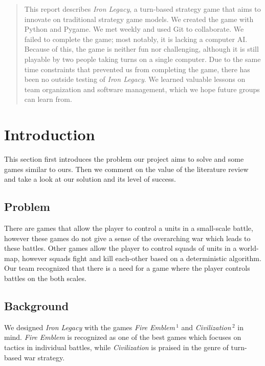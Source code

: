 \documentclass{article}
\begin{document}
\vfill

\begin{abstract}
This report describes \emph{Iron Legacy}, a turn-based strategy game that aims 
to innovate on traditional strategy game models. We created the game with 
Python and Pygame. We met weekly and used Git to collaborate. We failed to 
complete the game; most notably, it is lacking a computer AI. Because of this, 
the game is neither fun nor challenging, although it is still playable by two
people taking turns on a single computer. Due to the same time constraints that 
prevented us from completing the game, there has been no outside testing of 
\emph{Iron Legacy}. We learned valuable lessons on team organization and 
software management, which we hope future groups can learn from.
\end{abstract}

\clearpage

\tableofcontents

\clearpage

\section*{Introduction}
This section first introduces the problem our project aims to solve and some
games similar to ours.
Then we comment on the value of the literature review and take a look at our
solution and its level of success.

\subsection*{Problem}
There are games that allow the player to control a units in a
small-scale battle, however these games do not give a sense of the overarching
war which leads to these battles.
Other games allow the player to control squads of units in a world-map,
however squads fight and kill each-other based on a deterministic algorithm.
Our team recognized that there is a need for a game where the player controls
battles on the both scales.

\subsection*{Background}
We designed \emph{Iron Legacy} with the games 
\emph{Fire Emblem}$\,^1$ and \emph{Civilization}$\,^2$ 
in mind.
\emph{Fire Emblem} is recognized as one of the best games which
focuses on tactics in individual battles,
while \emph{Civilization} is praised in the genre of turn-based war strategy.
\end{document}
